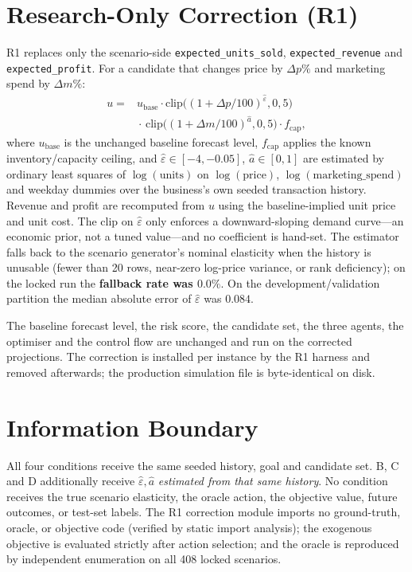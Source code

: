 \documentclass[10pt,twocolumn,a4paper]{article}
\newcommand{\code}[1]{\texttt{#1}}
\begin{document}
\section{Research-Only Correction (R1)}\label{sec:correction}
R1 replaces only the scenario-side \code{expected\_units\_sold},
\code{expected\_revenue} and \code{expected\_profit}. For a candidate that
changes price by $\Delta p\%$ and marketing spend by $\Delta m\%$:
\begin{equation}
\begin{aligned}
u = {}& u_{\mathrm{base}}\cdot
\mathrm{clip}\!\big((1+\Delta p/100)^{\hat\varepsilon},0,5\big)\\[2pt]
&{}\cdot\,
\mathrm{clip}\!\big((1+\Delta m/100)^{\hat a},0,5\big)\cdot f_{\mathrm{cap}},
\end{aligned}
\end{equation}
where $u_{\mathrm{base}}$ is the unchanged baseline forecast level,
$f_{\mathrm{cap}}$ applies the known inventory/capacity ceiling, and
$\hat\varepsilon\in[-4,-0.05]$, $\hat a\in[0,1]$ are estimated by ordinary least
squares of $\log(\text{units})$ on $\log(\text{price})$,
$\log(\text{marketing\_spend})$ and weekday dummies over the business's own
seeded transaction history. Revenue and profit are recomputed from $u$ using the
baseline-implied unit price and unit cost. The clip on $\hat\varepsilon$ only
enforces a downward-sloping demand curve---an economic prior, not a tuned
value---and no coefficient is hand-set. The estimator falls back to the scenario
generator's nominal elasticity when the history is unusable (fewer than 20 rows,
near-zero log-price variance, or rank deficiency); on the locked run the
\textbf{fallback rate was $0.0\%$}. On the development/validation partition the
median absolute error of $\hat\varepsilon$ was $0.084$.

The baseline forecast level, the risk score, the candidate set, the three
agents, the optimiser and the control flow are unchanged and run on the
corrected projections. The correction is installed per instance by the R1
harness and removed afterwards; the production simulation file is byte-identical
on disk.

\section{Information Boundary}\label{sec:info}
All four conditions receive the same seeded history, goal and candidate set.
B, C and D additionally receive $\hat\varepsilon,\hat a$ \emph{estimated from
that same history}. No condition receives the true scenario elasticity, the
oracle action, the objective value, future outcomes, or test-set labels. The R1
correction module imports no ground-truth, oracle, or objective code (verified by
static import analysis); the exogenous objective is evaluated strictly after
action selection; and the oracle is reproduced by independent enumeration on all
408 locked scenarios.
\end{document}
